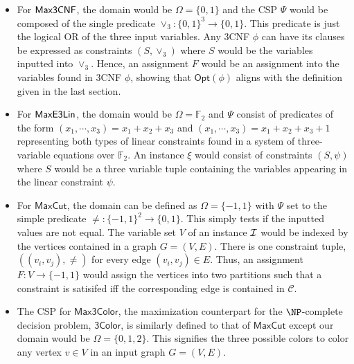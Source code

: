  \begin{example} \hfill{}
    \begin{itemize}
      \item For $\mathsf{Max3CNF}$, the domain would be $\Omega=\{0,1\}$ and the CSP $\Psi$ would be composed of the single predicate $\vee_{3}:\{0,1\}^3 \rightarrow \{0,1\}$. This predicate is just the logical OR of the three input variables. Any 3CNF $\phi$ can have its clauses be expressed as constraints $(S,\vee_{3})$ where $S$ would be the variables inputted into $\vee_{3}$. Hence, an assignment $F$ would be an assignment into the variables found in 3CNF $\phi$, showing that $\mathsf{Opt}(\phi)$ aligns with the definition given in the last section. \newline

      \item For $\mathsf{MaxE3Lin}$, the domain would be $\Omega = \mathbb{F}_2$ and  $\Psi$ consist of predicates of the form $(x_1,\cdots,x_3) = x_1 + x_2 + x_3$ and $(x_1,\cdots,x_3) = x_1 + x_2 + x_3 + 1$ representing both types of linear constraints found in a system of three-variable equations over $\mathbb{F}_2$. An instance $\xi$ would consist of constraints $(S,\psi)$ where $S$ would be a three variable tuple containing the variables appearing in the linear constraint $\psi$. \newline

      \item For $\mathsf{MaxCut}$, the domain can be defined as $\Omega = \{-1,1\}$ with $\Psi$ set to the simple predicate $\neq:\{-1,1\}^2 \rightarrow \{0,1\}$. This simply tests if the inputted values are not equal. The variable set $V$ of an instance $\mathcal{I}$ would be indexed by the vertices contained in a graph $G=(V,E)$. There is one constraint tuple, $((v_i,v_j), \neq)$ for every edge $(v_i,v_j) \in E$. Thus, an assignment $F:V \rightarrow \{-1,1\}$ would assign the vertices into two partitions such that a constraint is satisifed iff the corresponding edge is contained in $\mathcal{C}$. \newline

      \item The CSP for $\mathsf{Max3Color}$, the maximization counterpart for the $\NP$-complete decision problem, $\mathsf{3Color}$, is similarly defined to that of $\mathsf{MaxCut}$ except our domain would be $\Omega = \{0,1,2\}$. This signifies the three possible colors to color any vertex $v \in V$ in an input graph $G = (V,E)$.
    \end{itemize}
  \end{example}

